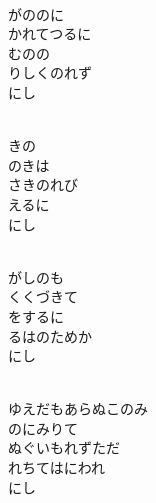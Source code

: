 \documentclass[10pt,b5j]{tarticle} %
\begin{document}
\vspace{1.5em} %
\newcommand{\linespace}{0.5em} %
\newcommand{\blocksize}{0.5\hsize} %
\newcommand{\itemmargin}{6em} %
\begin{enumerate} %
    \setlength{\itemindent}{\itemmargin} %
    \begin{minipage}[c]{\blocksize}
    
        \vspace{\linespace}
        \item~\\
        がののに\\
        かれてつるに\\
        むのの\\
        りしくのれず\\
        にし
        
        \vspace{\linespace}
        \item~\\
        きの\\
        のきは\\
        さきのれび\\
        えるに\\
        にし
        
        \vspace{\linespace}
        \item~\\
        がしのも\\
        くくづきて\\
        をするに\\
        るはのためか\\
        にし
        
        \vspace{\linespace}
        \item~\\
        ゆえだもあらぬこのみ\\
        のにみりて\\
        ぬぐいもれずただ\\
        れちてはにわれ\\
        にし
    
    \end{minipage}
\end{enumerate} %
\end{document}
